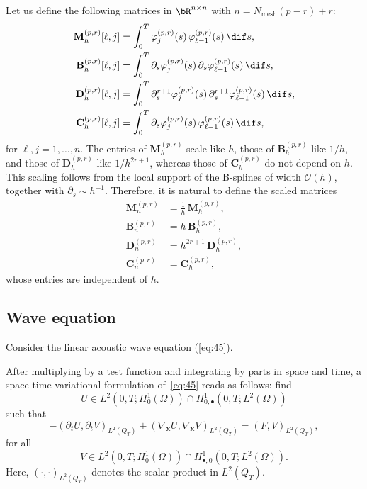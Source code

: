 \documentclass[addpoints,12pt,letter]{article}
\DeclareMathOperator{\mesh}{mesh} %
\newcommand{\bx}{\boldsymbol{x}}
\newcommand{\Om}{\Omega}
\newcommand{\ph}{\varphi}
\newcommand{\TF}{T}
\renewcommand{\d}{\dif}
\numberwithin{equation}{section}
\theoremstyle{definition}
\begin{document}
Let us define the following matrices in $\bR^{n\times n}$ with $n=N_{\mesh}(p-r)+r$:
\begin{equation}\label{eq:43}
\begin{aligned}
\mathbf{M}^{(p,r)}_{h}[\ell,j]
&=\int_{0}^{\TF}\ph_{j}^{(p,r)}(s)\,\ph_{\ell-1}^{(p,r)}(s)\,\d s,\\
\mathbf{B}^{(p,r)}_{h}[\ell,j]
&=\int_{0}^{\TF}\partial_{s}\ph_{j}^{(p,r)}(s)\,\partial_{s}\ph_{\ell-1}^{(p,r)}(s)\,\d s,\\
\mathbf{D}^{(p,r)}_{h}[\ell,j]
&=\int_{0}^{\TF}\partial_{s}^{r+1}\ph_{j}^{(p,r)}(s)\,\partial_{s}^{r+1}\ph_{\ell-1}^{(p,r)}(s)\,\d s,\\
\mathbf{C}^{(p,r)}_{h}[\ell,j]
&=\int_{0}^{\TF}\partial_{s}\ph_{j}^{(p,r)}(s)\,\ph_{\ell-1}^{(p,r)}(s)\,\d s,
\end{aligned}
\end{equation}
for $\ell,j=1,\ldots,n$.
The entries of $\mathbf{M}_{h}^{(p,r)}$ scale like $h$, those of $\mathbf{B}_{h}^{(p,r)}$ like $1/h$, and those of $\mathbf{D}_{h}^{(p,r)}$ like $1/h^{2r+1}$, whereas those of $\mathbf{C}_{h}^{(p,r)}$ do not depend on $h$. This scaling follows from the local support of the B-splines of width $\mathcal{O}(h)$, together with $\partial_{s}\sim h^{-1}$. Therefore, it is natural to define the scaled matrices
\begin{equation}\label{eq:44}
\begin{aligned}
\mathbf{M}_{n}^{(p,r)} &=\frac{1}{h}\,\mathbf{M}_{h}^{(p,r)},\\
\mathbf{B}_{n}^{(p,r)} &=h\,\mathbf{B}_{h}^{(p,r)},\\
\mathbf{D}_{n}^{(p,r)} &=h^{2r+1}\,\mathbf{D}_{h}^{(p,r)},\\
\mathbf{C}_{n}^{(p,r)} &=\mathbf{C}_{h}^{(p,r)},
\end{aligned}
\end{equation}
whose entries are independent of $h$.


\subsection{Wave equation}

Consider the linear acoustic wave equation (\ref{eq:45}).

After multiplying by a test function and integrating by parts in space and time, a space-time variational formulation of~\eqref{eq:45} reads as follows: find
\[
U\in L^{2}(0,\TF ;H^{1}_{0}(\Om))\cap H^{1}_{0,\bullet}(0,\TF ;L^{2}(\Om))
\]
such that
\begin{equation}\label{eq:46}
-(\partial_{t} U,\partial_{t} V)_{L^{2}(Q_{\TF})}
+(\nabla_{\bx} U,\nabla_{\bx} V)_{L^{2}(Q_{\TF})}
=(F, V)_{L^{2}(Q_{\TF})},
\end{equation}
for all
\[
V\in L^{2}(0,\TF ;H^{1}_{0}(\Om))\cap H^{1}_{\bullet,0}(0,\TF ;L^{2}(\Om)).
\]
Here, $(\cdot,\cdot)_{L^{2}(Q_{\TF})}$ denotes the scalar product in $L^{2}(Q_{\TF})$.
\end{document}

